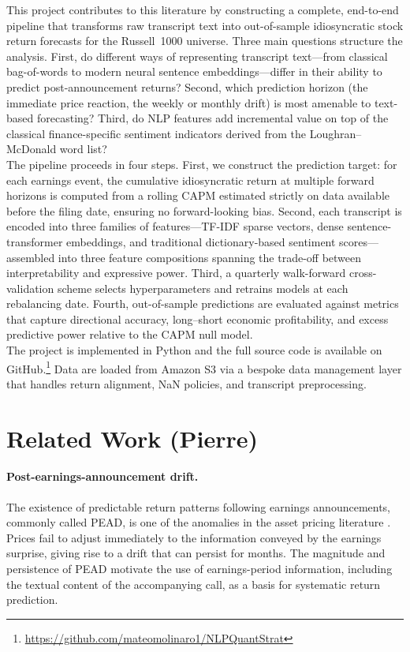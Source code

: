 \documentclass{article}
\begin{document}
This project contributes to this literature by constructing a complete, end-to-end pipeline that transforms raw transcript text into out-of-sample idiosyncratic stock return forecasts for the Russell~1000 universe. Three main questions structure the analysis. First, do different ways of representing transcript text---from classical bag-of-words to modern neural sentence embeddings---differ in their ability to predict post-announcement returns? Second, which prediction horizon (the immediate price reaction, the weekly or monthly drift) is most amenable to text-based forecasting? Third, do NLP features add incremental value on top of the classical finance-specific sentiment indicators derived from the Loughran--McDonald word list?\\

The pipeline proceeds in four steps. First, we construct the prediction target: for each earnings event, the cumulative idiosyncratic return at multiple forward horizons is computed from a rolling CAPM estimated strictly on data available before the filing date, ensuring no forward-looking bias. Second, each transcript is encoded into three families of features---TF-IDF sparse vectors, dense sentence-transformer embeddings, and traditional dictionary-based sentiment scores---assembled into three feature compositions spanning the trade-off between interpretability and expressive power. Third, a quarterly walk-forward cross-validation scheme selects hyperparameters and retrains models at each rebalancing date. Fourth, out-of-sample predictions are evaluated against metrics that capture directional accuracy, long--short economic profitability, and excess predictive power relative to the CAPM null model.\\

The project is implemented in Python and the full source code is available on GitHub.\footnote{\url{https://github.com/mateomolinaro1/NLPQuantStrat}} Data are loaded from Amazon S3 via a bespoke data management layer that handles return alignment, NaN policies, and transcript preprocessing.


\section{Related Work (Pierre)}

\paragraph{Post-earnings-announcement drift.}
The existence of predictable return patterns following earnings announcements, commonly called PEAD, is one of the anomalies in the asset pricing literature \cite{ball1968}. Prices fail to adjust immediately to the information conveyed by the earnings surprise, giving rise to a drift that can persist for months. The magnitude and persistence of PEAD motivate the use of earnings-period information, including the textual content of the accompanying call, as a basis for systematic return prediction.
\end{document}
